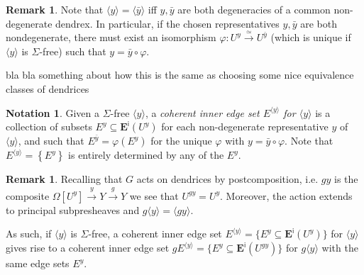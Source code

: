\documentclass[a4paper,10pt
,draft
]{article}%
\numberwithin{equation}{section}
\numberwithin{figure}{section}
\theoremstyle{definition} %
\newtheorem{remark}[equation]{Remark}%
\newtheorem{notation}[equation]{Notation}%
\newcommand{\1}{\ensuremath{\mathbbm 1}}%
\begin{document}
\begin{remark}
	Note that
	$\langle y \rangle = \langle \bar{y} \rangle$
	iff $y,\bar{y}$ are both degeneracies of a common non-degenerate dendrex.
	In particular, if the chosen representatives $y,\bar{y}$ are both nondegenerate,
	there must exist an isomorphism
	$\varphi \colon U^y \xrightarrow{\simeq} U^{\bar{y}}$
	(which is unique if 
	$\langle y \rangle$ is $\Sigma$-free)
	such that $y= \bar{y} \circ \varphi$.
\end{remark}


{\color{red} bla bla something about how this is the same as choosing some nice equivalence classes of dendrices}


\begin{notation}
	Given a $\Sigma$-free $\langle y \rangle$,
	a \emph{coherent inner edge set $E^{\langle y \rangle}$ for $\langle y \rangle$}
	is a collection of subsets 
	$E^y \subseteq \boldsymbol{E}^{\mathsf{i}}(U^y)$
	for each non-degenerate representative $y$ of $\langle y \rangle$, and such that 
	$E^{\bar{y}}  = \varphi \left(E^y \right)$
	for the unique $\varphi$ with $y= \bar{y} \circ \varphi$.
	Note that $E^{\langle y \rangle} = \left\{E^y \right\}$
	is entirely determined by any of the $E^y$.
\end{notation}


\begin{remark}
	Recalling that $G$ acts on dendrices by postcomposition, i.e.
	$gy$ is the composite
	$\Omega[U^y] \xrightarrow{y} Y \xrightarrow{g} Y$
	we see that $U^{gy} = U^{y}$.
	Moreover, the action extends to principal subpresheaves and
	$g \langle y \rangle = \langle g y \rangle$.
	
	As such, if $\langle y\rangle$ is $\Sigma$-free, a coherent inner edge set 
	$E^{\langle y \rangle} = \{E^y \subseteq \boldsymbol{E}^{\mathsf{i}}(U^y)\}$
	for $\langle y \rangle$
	gives rise to a coherent inner edge set 
	$g E^{\langle y \rangle} = \{E^y \subseteq \boldsymbol{E}^{\mathsf{i}}(U^{gy})\}$
	for $g\langle y \rangle$
	with the same edge sets $E^y$.
\end{remark}
\end{document}
